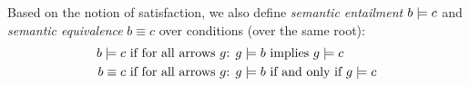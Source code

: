  Based on the notion of satisfaction, we also define \emph{semantic entailment} $b\models c$ and \emph{semantic equivalence} $b\equiv c$ over conditions (over the same root):
%
\begin{align*}
b \models c & \text{ if for all arrows $g$: } g\models b \text{ implies } g\models c \\
b \equiv c & \text{ if for all arrows $g$: } g\models b \text{ if and only if } g\models c 
\end{align*}

